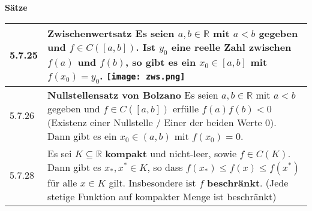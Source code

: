     \noindent 
    \textbf{Sätze}
    \begin{table}[H]
    \begin{tabularx}{\textwidth}{X m{16cm}}
        \toprule

        5.7.25& \textbf{Zwischenwertsatz} \hfill \break
                Es seien $a,b \in \mathbb{R}$ mit $a < b$ gegeben und $f \in C([a,b])$. Ist $y_0$ eine reelle Zahl zwischen $f(a)$ und $f(b)$,
                so gibt es ein $x_0 \in [a,b]$ mit $f(x_0) = y_0$. \hfill \break
                \texttt{[image: zws.png]} \\
        \midrule
        5.7.26& \textbf{Nullstellensatz von Bolzano} \hfill \break
                Es seien $a,b \in \mathbb{R}$ mit $a < b$ gegeben und $f \in C([a,b])$ erfülle $f(a)f(b) < 0$ (Existenz einer Nullstelle /
                Einer der beiden Werte 0).
                Dann gibt es ein $x_0 \in (a,b)$ mit $f(x_0) = 0$. \\
        \midrule
        5.7.28& Es sei $K \subseteq \mathbb{R}$ \textbf{kompakt} und nicht-leer, sowie $f \in C(K)$. Dann gibt es $x_*, x^* \in K$, so dass
                $f(x_*) \leq f(x) \leq f(x^*)$ für alle $x \in K$ gilt. Insbesondere ist $f$ \textbf{beschränkt}. (Jede stetige Funktion auf 
                kompakter Menge ist beschränkt)\\

        \bottomrule
    \end{tabularx}
    \end{table}

